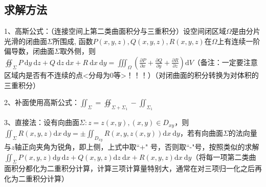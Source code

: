 \subsection{求解方法}

1、高斯公式：（连接空间上第二类曲面积分与三重积分）设空间闭区域$ \Omega $是由分片光滑的闭曲面$ \Sigma $所围成, 函数$ P(x, y, z), Q(x, y, z), R(x, y, z) $在$ \Omega $上有连续一阶偏导数，闭曲面$ \Sigma $取外侧，则$ \oiint_{\Sigma} P \mathrm{~d} y \mathrm{~d} z+Q \mathrm{~d} z \mathrm{~d} x+R \mathrm{~d} x \mathrm{~d} y=\iiint_{\Omega}\left(\frac{\partial P}{\partial x}+\frac{\partial Q}{\partial y}+\frac{\partial R}{\partial z}\right) \mathrm{d} V $（备注：一定要注意区域内是否有不连续的点<分母为0等>！！！）（对闭曲面的积分转换为对体积的三重积分）

2、补面使用高斯公式：$ \iint_{\Sigma}=\oiint_{\Sigma+\Sigma_{1}}-\iint_{\Sigma_{1}} $

3、直接法：设有向曲面$ \Sigma: z=z(x, y),(x, y) \in D_{x y} $，则$ \iint_{\Sigma} R(x, y, z) \mathrm{d} x \mathrm{~d} y=\pm \iint_{D_{x y}} R(x, y, z(x, y)) \mathrm{d} x \mathrm{~d} y $，若有向曲面$ \Sigma $的法向量与$ z $轴正向夹角为锐角，即上侧，上式中取“+" 号，否则取“-"号，按照类似的求解$ \iint_{\Sigma} P(x, y, z) \mathrm{d} y \mathrm{~d} z+Q(x, y, z) \mathrm{d} z \mathrm{~d} x+R(x, y, z) \mathrm{d} x \mathrm{~d} y $（将每一项第二类曲面积分都化为二重积分计算，计算三项计算量特别大，通常在对三项归一化之后再化为二重积分计算）


